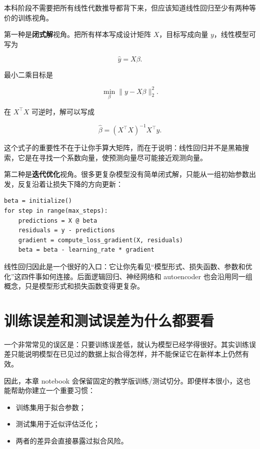 本科阶段不需要把所有线性代数推导都背下来，但应该知道线性回归至少有两种等价的训练视角。

第一种是\textbf{闭式解}视角。把所有样本写成设计矩阵 \(X\)，目标写成向量 \(y\)，线性模型可写为

\[
\hat{y}=X\beta.
\]

最小二乘目标是

\[
\min_\beta \|y-X\beta\|_2^2.
\]

在 \(X^\top X\) 可逆时，解可以写成

\[
\hat{\beta}=(X^\top X)^{-1}X^\top y.
\]

这个式子的重要性不在于让你手算大矩阵，而在于说明：线性回归并不是黑箱搜索，它是在寻找一个系数向量，使预测向量尽可能接近观测向量。

第二种是\textbf{迭代优化}视角。很多更复杂模型没有简单闭式解，只能从一组初始参数出发，反复沿着让损失下降的方向更新：

\begin{examplebox}[梯度下降的最小直觉]
\begin{lstlisting}[style=pythonstyle]
beta = initialize()
for step in range(max_steps):
    predictions = X @ beta
    residuals = y - predictions
    gradient = compute_loss_gradient(X, residuals)
    beta = beta - learning_rate * gradient
\end{lstlisting}
\end{examplebox}

线性回归因此是一个很好的入口：它让你先看见“模型形式、损失函数、参数和优化”这四件事如何连接。后面逻辑回归、神经网络和 autoencoder 也会沿用同一组概念，只是模型形式和损失函数变得更复杂。

\section{训练误差和测试误差为什么都要看}

一个非常常见的误区是：只要训练误差低，就认为模型已经学得很好。其实训练误差只能说明模型在已见过的数据上拟合得怎样，并不能保证它在新样本上仍然有效。

因此，本章 notebook 会保留固定的教学版训练/测试切分。即便样本很小，这也能帮助你建立一个重要习惯：

\begin{itemize}
    \item 训练集用于拟合参数；
    \item 测试集用于近似评估泛化；
    \item 两者的差异会直接暴露过拟合风险。
\end{itemize}

